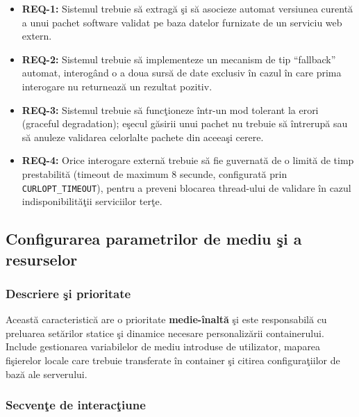 \documentclass[12pt, a4paper]{article}
\begin{document}
\begin{itemize}
    \item \textbf{REQ-1:} Sistemul trebuie s\u{a} extrag\u{a} \c{s}i s\u{a} asocieze automat versiunea curent\u{a} a unui
    pachet software validat pe baza datelor furnizate de un serviciu web extern.
    \item \textbf{REQ-2:} Sistemul trebuie s\u{a} implementeze un mecanism de tip ``fallback'' automat,
    interog\^{a}nd o a doua surs\u{a} de date exclusiv \^{i}n cazul \^{i}n care prima interogare nu returneaz\u{a} un
    rezultat pozitiv.
    \item \textbf{REQ-3:} Sistemul trebuie s\u{a} func\c{t}ioneze \^{i}ntr-un mod tolerant la erori (graceful
    degradation); e\c{s}ecul g\u{a}sirii unui pachet nu trebuie s\u{a} \^{i}ntrerup\u{a} sau s\u{a} anuleze validarea
    celorlalte pachete din aceea\c{s}i cerere.
    \item \textbf{REQ-4:} Orice interogare extern\u{a} trebuie s\u{a} fie guvernat\u{a} de o limit\u{a} de timp
    prestabilit\u{a} (timeout de maximum 8 secunde, configurat\u{a} prin \texttt{CURLOPT\_TIMEOUT}), pentru a preveni
    blocarea thread-ului de validare \^{i}n cazul indisponibilit\u{a}\c{t}ii serviciilor ter\c{t}e.
\end{itemize}

\subsection{Configurarea parametrilor de mediu \c{s}i a resurselor}

\subsubsection{Descriere \c{s}i prioritate}

Aceast\u{a} caracteristic\u{a} are o prioritate \textbf{medie-înalt\u{a}} \c{s}i este responsabil\u{a} cu preluarea set\u{a}rilor
statice \c{s}i dinamice necesare personaliz\u{a}rii containerului. Include gestionarea variabilelor de mediu
introduse de utilizator, maparea fi\c{s}ierelor locale care trebuie transferate \^{i}n container \c{s}i citirea
configura\c{t}iilor de baz\u{a} ale serverului.

\subsubsection{Secven\c{t}e de interac\c{t}iune}
\end{document}
